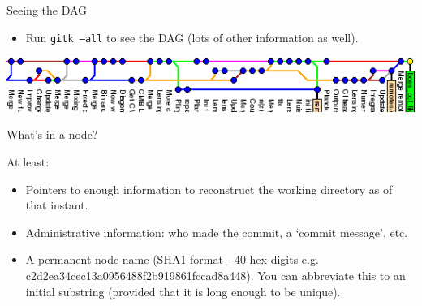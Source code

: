 \documentclass[usenames,dvipsnames]{beamer}
\newcommand{\code}[1]{\colorbox{light-gray}{\texttt{#1}}}
\begin{document}
\begin{frame}{Seeing the DAG}
  \begin{block}{}
    \begin{itemize}
      \item{Run \code{gitk --all} to see the DAG (lots of other information as well).}
    \end{itemize}
  \end{block}
  \begin{block}{}
    \begin{center}
      \includegraphics[scale=0.8]{DAG.png}
    \end{center}
  \end{block}
\end{frame}


\begin{frame}{What's in a node?}
  \begin{block}{}
    At least:
    \begin{itemize}
      \item{Pointers to enough information to reconstruct the working directory as of that instant.}
      \item{Administrative information: who made the commit, a `commit message', etc.}
      \item{A permanent node name (SHA1 format - 40 hex digits e.g. c2d2ea34cec13a0956488f2b919861fccad8a448). You can abbreviate this to an initial substring (provided that it is long enough to be unique).}
    \end{itemize}
  \end{block}
\end{frame}
\end{document}
